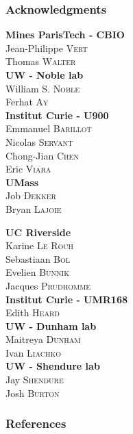 \documentclass[xcolor=dvipsnames]{beamer}
\begin{document}
\begin{frame}
\frametitle{Acknowledgments}
\fboxsep=0pt
\noindent
\begin{minipage}[t]{0.48\linewidth}
\textbf{Mines ParisTech - CBIO} \\
Jean-Philippe \textsc{Vert} \\
Thomas \textsc{Walter} \\

\textbf{UW - Noble lab} \\
William S. \textsc{Noble} \\
Ferhat \textsc{Ay} \\

\textbf{Institut Curie - U900} \\
Emmanuel \textsc{Barillot} \\
Nicolas \textsc{Servant} \\
Chong-Jian \textsc{Chen} \\
Eric \textsc{Viara} \\

\textbf{UMass} \\
Job \textsc{Dekker} \\
Bryan \textsc{Lajoie} \\

\end{minipage}
\hfill%
\begin{minipage}[t]{0.48\linewidth}

\textbf{UC Riverside} \\
Karine \textsc{Le Roch} \\
Sebastiaan \textsc{Bol} \\
Evelien \textsc{Bunnik} \\
Jacques \textsc{Prudhomme} \\

\textbf{Institut Curie - UMR168} \\
Edith \textsc{Heard} \\

\textbf{UW - Dunham lab} \\
Maitreya \textsc{Dunham} \\
Ivan \textsc{Liachko} \\

\textbf{UW - Shendure lab} \\
Jay \textsc{Shendure} \\
Josh \textsc{Burton} \\

\end{minipage}

\end{frame}

\begin{frame}
  \frametitle{References}
  
  
\end{frame}
\end{document}
